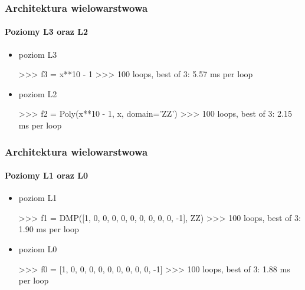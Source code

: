 \documentclass{beamer}
\begin{document}
\begin{frame}[fragile]
    \frametitle{Architektura wielowarstwowa}
    \framesubtitle{Poziomy L3 oraz L2}

    \begin{itemize}
        \item poziom L3
            \begin{python}
>>> f3 = x**10 - 1
>>> %
100 loops, best of 3: 5.57 ms per loop
            \end{python}
            \pause
        \item poziom L2
            \begin{python}
>>> f2 = Poly(x**10 - 1, x, domain='ZZ')
>>> %
100 loops, best of 3: 2.15 ms per loop
            \end{python}
    \end{itemize}
\end{frame}

\begin{frame}[fragile]
    \frametitle{Architektura wielowarstwowa}
    \framesubtitle{Poziomy L1 oraz L0}

    \begin{itemize}
        \item poziom L1
            \begin{python}
>>> f1 = DMP([1, 0, 0, 0, 0, 0, 0, 0, 0, 0, -1], ZZ)
>>> %
100 loops, best of 3: 1.90 ms per loop
            \end{python}
            \pause
        \item poziom L0
            \begin{python}
>>> f0 = [1, 0, 0, 0, 0, 0, 0, 0, 0, 0, -1]
>>> %
100 loops, best of 3: 1.88 ms per loop
            \end{python}
    \end{itemize}
\end{frame}
\end{document}
